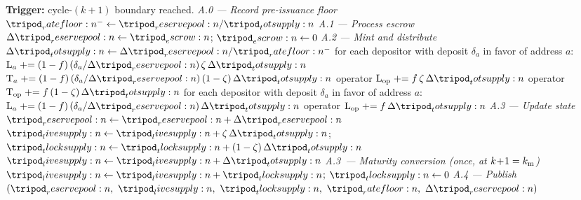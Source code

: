 \documentclass[../main.tex]{subfiles}
\begin{document}
\begin{algorithm}
    \caption{Cycle Receipt Processing.}
    \label{alg:operations:cycle-processing}
    \begin{algorithmic}[1]
        \State \textbf{Trigger:} cycle-$(k\!+\!1)$ boundary reached.
        \Statex
        \State \textit{A.0 --- Record pre-issuance floor}
        \State \quad $\ratefloor{}^{-} \gets \reservepool{}/\totsupply{}$
        \Statex
        \State \textit{A.1 --- Process escrow}
        \State \quad $\Delta\reservepool{} \gets \escrow{}$;\quad
               $\escrow{} \gets 0$
        \Statex
        \State \textit{A.2 --- Mint and distribute}
        \State \quad $\Delta\totsupply{} \gets \Delta\reservepool{}/\ratefloor{}^{-}$
            \State for each depositor with deposit $\delta_a$ in favor of address $a$:
            \State \quad $\mathrm{L}_a \mathrel{+}=
                   (1-\feerate)\,(\delta_a/\Delta\reservepool{})\,
                   \livesplit\,\Delta\totsupply{}$
            \State \quad $\mathrm{T}_a \mathrel{+}=
                   (1-\feerate)\,(\delta_a/\Delta\reservepool{})\,
                   (1-\livesplit)\,\Delta\totsupply{}$
            \State operator $\mathrm{L}_{\opidx} \mathrel{+}=
                   \feerate\,\livesplit\,\Delta\totsupply{}$
            \State operator $\mathrm{T}_{\opidx} \mathrel{+}=
                   \feerate\,(1-\livesplit)\,\Delta\totsupply{}$
        \Else
            \State for each depositor with deposit $\delta_a$ in favor of address $a$:
                   $\mathrm{L}_a \mathrel{+}=
                   (1-\feerate)\,(\delta_a/\Delta\reservepool{})\,\Delta\totsupply{}$
            \State operator $\mathrm{L}_{\opidx} \mathrel{+}=
                   \feerate\,\Delta\totsupply{}$
        \EndIf
        \Statex
        \State \textit{A.3 --- Update state}
        \State \quad $\reservepool{} \gets \reservepool{} + \Delta\reservepool{}$
            \State \quad $\livesupply{} \gets \livesupply{}
                   + \livesplit\,\Delta\totsupply{}$;\quad
                   $\tlocksupply{} \gets \tlocksupply{}
                   + (1-\livesplit)\,\Delta\totsupply{}$
        \Else
            \State \quad $\livesupply{} \gets \livesupply{} + \Delta\totsupply{}$
        \EndIf
        \Statex
        \State \textit{A.3\textonehalf\ --- Maturity conversion (once, at $k\!+\!1 = k\sb{\mathrm{m}}$)}
            \State \quad $\livesupply{} \gets \livesupply{} + \tlocksupply{}$;\quad
                   $\tlocksupply{} \gets 0$
        \EndIf
        \Statex
        \State \textit{A.4 --- Publish}
        \State \quad $(\reservepool{},\ \livesupply{},\ \tlocksupply{},\
               \ratefloor{},\ \Delta\reservepool{})$
    \end{algorithmic}
\end{algorithm}

\end{document}
